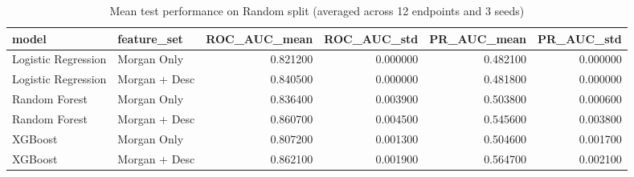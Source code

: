 \begin{table}
\caption{Mean test performance on Random split (averaged across 12 endpoints and 3 seeds)}
\label{tab:results_random}
\begin{tabular}{llrrrr}
\toprule
model & feature_set & ROC_AUC_mean & ROC_AUC_std & PR_AUC_mean & PR_AUC_std \\
\midrule
Logistic Regression & Morgan Only & 0.821200 & 0.000000 & 0.482100 & 0.000000 \\
Logistic Regression & Morgan + Desc & 0.840500 & 0.000000 & 0.481800 & 0.000000 \\
Random Forest & Morgan Only & 0.836400 & 0.003900 & 0.503800 & 0.000600 \\
Random Forest & Morgan + Desc & 0.860700 & 0.004500 & 0.545600 & 0.003800 \\
XGBoost & Morgan Only & 0.807200 & 0.001300 & 0.504600 & 0.001700 \\
XGBoost & Morgan + Desc & 0.862100 & 0.001900 & 0.564700 & 0.002100 \\
\bottomrule
\end{tabular}
\end{table}
